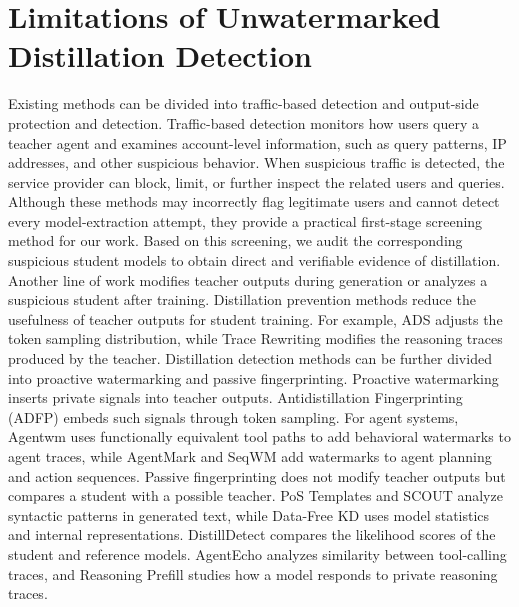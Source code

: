 \section{Limitations of Unwatermarked Distillation Detection}
\label{sec:similarity-attribution}

Existing methods can be divided into traffic-based detection and output-side
protection and detection. Traffic-based detection monitors how users query a
teacher agent and examines account-level information, such as query patterns,
IP addresses, and other suspicious behavior. When suspicious traffic is
detected, the service provider can block, limit, or further inspect the related
users and queries. Although these methods may incorrectly flag legitimate
users and cannot detect every model-extraction attempt, they provide a
practical first-stage screening method for our work. Based on this screening,
we audit the corresponding suspicious student models to obtain direct and
verifiable evidence of distillation. Another line of work modifies teacher
outputs during generation or analyzes a suspicious student after training.
Distillation prevention methods reduce the usefulness of teacher outputs for
student training. For example, ADS adjusts the token sampling
distribution, while Trace Rewriting modifies the reasoning traces produced by
the teacher. Distillation detection methods can be further divided into
proactive watermarking and passive fingerprinting. Proactive watermarking
inserts private signals into teacher outputs. Antidistillation Fingerprinting
(ADFP) embeds such signals through token sampling. For agent systems, Agentwm
uses functionally equivalent tool paths to add behavioral watermarks to agent
traces, while AgentMark and SeqWM add watermarks to agent planning and action
sequences. Passive fingerprinting does not modify teacher outputs but compares
a student with a possible teacher. PoS Templates and SCOUT analyze syntactic
patterns in generated text, while Data-Free KD uses model statistics and
internal representations. DistillDetect compares the likelihood scores of the
student and reference models. AgentEcho analyzes similarity between
tool-calling traces, and Reasoning Prefill studies how a model responds to
private reasoning traces.

